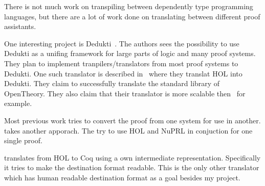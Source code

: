 There is not much work on transpiling between dependently type programming
languages, but there are a lot of work done on translating between different
proof assistants.

One interesting project is Dedukti~\cite{assaf2016dedukti}. The authors sees
the possibility to use Dedukti as a unifing framework for large parts of logic
and many proof systems. They plan to implement tranpilers/translators from most
proof systems to Dedukti. One such translator is described
in~\cite{assaf2015translating} where they translat HOL into Dedukti. They claim
to successfully translate the standard library of OpenTheory. %
They also claim that their translator is more scalable
then~\cite{obua2006importing} for example.

Most previous work tries to convert the proof from one system for use in
another. \cite{felty1997hybrid} takes another apporach. The try to use HOL and
NuPRL in conjuction for one single proof.

\cite{denney2000prototype} translates from HOL to Coq using a own intermediate
representation. Specifically it tries to make the destination format readable.
This is the only other translator which has human readable destination format
as a goal besides my project.

